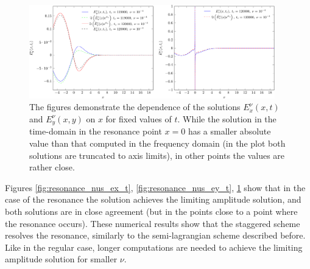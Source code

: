 \begin{figure}
\includegraphics[width=0.95\textwidth]{res/ex_fixed_t_1e4_2-crop.pdf}
\caption{The figures demonstrate the dependence of the solutions 
$E_x^{\nu}(x,t)$ and $E_y^{\nu}(x,y)$ on $x$ for fixed values of $t$. While the solution in the time-domain 
in the resonance point $x=0$ has a smaller absolute value than that computed in the frequency domain (in the plot both solutions are truncated to 
axis limits), in other points the values are rather close. }
\label{fig:resonance_nus_eyx_t}
\end{figure}

Figures \ref{fig:resonance_nus_ex_t}, \ref{fig:resonance_nus_ey_t}, \ref{fig:resonance_nus_eyx_t} show that in the case of the resonance
the solution achieves the limiting amplitude solution, and both solutions are in close agreement (but in the points close to a point where the resonance occurs).
These numerical results show that the staggered scheme resolves the resonance, similarly to the semi-lagrangian scheme described before.  
Like in the regular case, 
longer computations are needed to achieve the limiting amplitude solution  
for smaller $\nu$.

